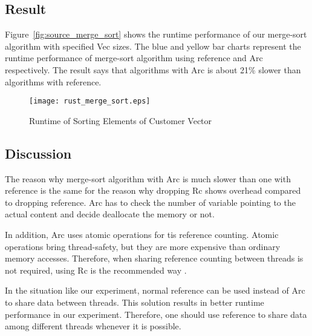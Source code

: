 \subsection{Result}
Figure~\ref{fig:source_merge_sort} shows the runtime performance of our merge-sort algorithm with specified Vec sizes. 
The blue and yellow bar charts represent the runtime performance of merge-sort algorithm using reference and Arc respectively. 
The result says that algorithms with Arc is about 21\% slower than algorithms with reference.

\begin{figure}[htb]
    \texttt{[image: rust\_merge\_sort.eps]}
    \caption{Runtime of Sorting Elements of Customer Vector}
    \label{fig:merge_sort}
\end{figure}

\subsection{Discussion}
The reason why merge-sort algorithm with Arc is much slower than one with reference is 
the same for the reason why dropping Rc shows overhead compared to dropping reference.
Arc has to check the number of variable pointing to the actual content and decide 
deallocate the memory or not.

In addition, Arc uses atomic operations for tis reference counting. Atomic operations bring thread-safety, but they are more expensive than ordinary memory accesses.
Therefore, when sharing reference counting between threads is not required, using Rc is the recommended way \cite{RustArcPage}.

In the situation like our experiment, normal reference can be used instead of Arc to share data between threads. 
This solution results in better runtime performance in our experiment. Therefore, one should use reference to share data among different threads 
whenever it is possible.

